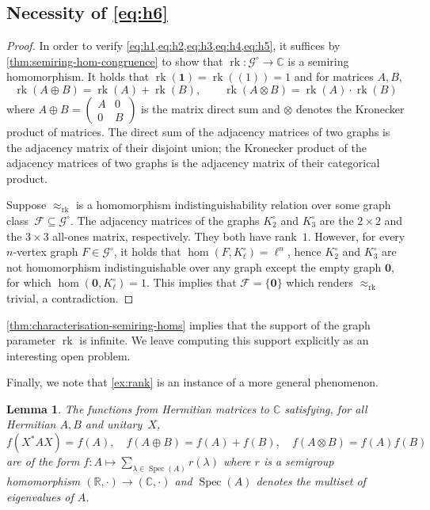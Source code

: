 \documentclass[11pt]{scrartcl}
\theoremstyle{definition}
\theoremstyle{plain}
\newtheorem{lemma}[definition]{Lemma}
\theoremstyle{remark}
\DeclareMathOperator{\rk}{rk}
\DeclareMathOperator{\Spec}{Spec}
\newcommand{\lG}{\mathcal{G}^\circ}
\begin{document}
	\subsection{Necessity of \texorpdfstring{\cref{eq:h6}}{c\_l condition}}


	\exRank*
	\begin{proof}
		In order to verify \cref{eq:h1,eq:h2,eq:h3,eq:h4,eq:h5}, 
		it suffices by \cref{thm:semiring-hom-congruence}
		to show that $\rk \colon \lG \to \mathbb{C}$ is a semiring homomorphism.
		It holds that $\rk(\boldsymbol{1}) = \rk((1)) = 1$
		and for matrices $A, B$,
		\[
			\rk(A \oplus B) = \rk(A) + \rk(B), \qquad
			\rk(A \otimes B) = \rk(A) \cdot \rk(B)
		\]
		where $A \oplus B = \left( \begin{smallmatrix}
			A & 0 \\ 0 & B
		\end{smallmatrix}\right)$ is the matrix direct sum and $\otimes$ denotes the Kronecker product of matrices.
		The direct sum of the adjacency matrices of two graphs is the adjacency matrix of their disjoint union;
		the Kronecker product of the adjacency matrices of two graphs is the adjacency matrix of their categorical product.


		Suppose $\approx_{\rk}$ is a homomorphism indistinguishability relation over some graph class~$\mathcal{F} \subseteq \lG$.
		The adjacency matrices of the graphs $K_2^\circ$ and $K_3^\circ$ 
		are the $2 \times 2$ and the $3 \times 3$ 
		all-ones matrix, respectively.
		They both have rank~$1$.
		However, for every $n$-vertex graph $F \in \lG$, it holds that
		$\hom(F, K_\ell^\circ) = \ell^n$, hence $K_2^\circ$ and $K_3^\circ$ are not homomorphism indistinguishable over any graph except the empty graph $\boldsymbol{0}$, for which $\hom(\boldsymbol{0}, K_\ell^\circ) = 1$.
		This implies that $\mathcal{F} = \{\boldsymbol{0}\}$ which renders $\approx_{\rk}$ trivial, a contradiction.
	\end{proof}

	\cref{thm:characterisation-semiring-homs} implies that the support of  the graph parameter $\rk$ is infinite. We leave computing this support explicitly as an interesting open problem.

    Finally, we note that \cref{ex:rank} is an instance of a more general phenomenon.
    \begin{lemma}\label{lem:rk}
		The functions from Hermitian matrices to $\mathbb{C}$ satisfying, for all Hermitian $A, B$ and unitary~$X$,
		\[
			f(X^{*}AX) = f(A), \quad
			f(A \oplus B) = f(A) + f(B), \quad
			f(A \otimes B) = f(A) f(B)
		\]
		are of the form $f \colon A \mapsto \sum_{\lambda \in \Spec(A)} r(\lambda)$
		where $r$ is a semigroup homomorphism $(\mathbb{R}, \cdot) \to (\mathbb{C}, \cdot)$
        and $\Spec(A)$ denotes the multiset of eigenvalues of $A$.
	\end{lemma}
\end{document}
